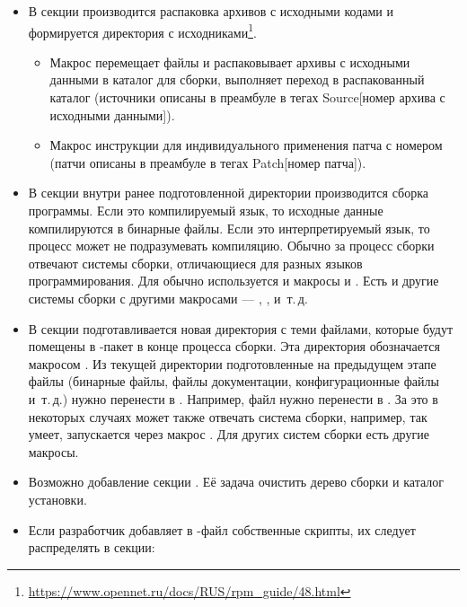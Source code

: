 \begin{itemize}
	\item В секции  производится распаковка архивов с исходными кодами и
		формируется директория с исходниками\footnote{\href{https://www.opennet.ru/docs/RUS/rpm_guide/48.html}{https://www.opennet.ru/docs/RUS/rpm\_guide/48.html}}.
	\begin{itemize}
		\item Макрос  перемещает файлы и распаковывает архивы с исходными данными в каталог для сборки,
		выполняет переход в распакованный каталог (источники описаны в преамбуле в тегах Source[номер архива с исходными данными]).
		\item Макрос  инструкции для индивидуального применения патча с номером (патчи описаны в преамбуле в тегах Patch[но\-мер патча]).
	\end{itemize}
	\item В секции  внутри ранее подготовленной директории производится
		сборка программы. Если это компилируемый язык, то исходные данные компилируются в бинарные
		файлы. Если это интерпретируемый язык, то процесс может не подразумевать компиляцию.
		Обычно за процесс сборки отвечают системы сборки, отличающиеся для разных языков
		программирования. Для  обычно используется  и макросы
		 и . Есть и другие системы сборки с другими
		макросами --- , ,  и~т.\,д.
	\item В секции  подготавливается новая директория с теми файлами, которые будут
		помещены в -пакет в конце процесса сборки. Эта директория обозначается макросом
		. Из текущей директории подготовленные на предыдущем этапе файлы (бинарные
		файлы, файлы документации, конфигурационные файлы и~т.\,д.) нужно перенести в .
		Например, файл  нужно перенести в .
		За это в некоторых случаях может также отвечать система сборки, например, 
		так умеет, запускается через макрос . Для других систем сборки есть другие макросы.
	\item Возможно добавление секции . Её задача очистить дерево сборки и каталог установки.
	\item Если разработчик добавляет в -файл собственные скрипты, их следует распределять в секции:
	\begin{itemize}

\end{itemize}
\end{itemize}
